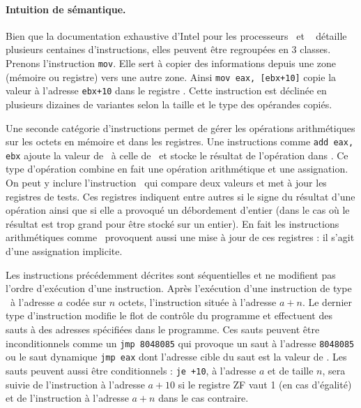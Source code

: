 \paragraph{Intuition de sémantique.}
% 

Bien que la documentation exhaustive d'Intel pour les processeurs \xq\ et \xs\ \cite{intel_vol2} détaille plusieurs centaines d'instructions, elles peuvent être regroupées en 3 classes.
Prenons l'instruction \texttt{mov}. Elle sert à copier des informations depuis une zone (mémoire ou registre) vers une autre zone.
Ainsi \texttt{mov eax, [ebx+10]} copie la valeur à l'adresse \texttt{ebx+10} dans le registre \eax. 
Cette instruction est déclinée en plusieurs dizaines de variantes selon la taille et le type des opérandes copiés.

Une seconde catégorie d'instructions permet de gérer les opérations arithmétiques sur les octets en mémoire et dans les registres.
Une instructions comme \texttt{add eax, ebx} ajoute la valeur de \ebx\ à celle de \eax\ et stocke le résultat de l'opération dans \eax.
Ce type d'opération combine en fait une opération arithmétique et une assignation. 
On peut y inclure l'instruction \cmp\ qui compare deux valeurs et met à jour les registres de tests. 
Ces registres indiquent entre autres si le signe du résultat d'une opération ainsi que si elle a provoqué un débordement d'entier (dans le cas où le résultat est trop grand pour être stocké sur un entier).
En fait les instructions arithmétiques comme \add\ provoquent aussi une mise à jour de ces registres : il s'agit d'une assignation implicite.

Les instructions précédemment décrites sont séquentielles et ne modifient pas l'ordre d'exécution d'une instruction. 
Après l'exécution d'une instruction de type \mov\ à l'adresse $a$ codée sur $n$ octets, l'instruction située à l'adresse $a+n$.
Le dernier type d'instruction modifie le flot de contrôle du programme et effectuent des sauts à des adresses spécifiées dans le programme.
Ces sauts peuvent être inconditionnels comme un \texttt{jmp 8048085} qui provoque un saut à l'adresse \texttt{8048085} ou le saut dynamique \texttt{jmp eax} dont l'adresse cible du saut est la valeur de \eax.
Les sauts peuvent aussi être conditionnels : \texttt{je +10}, à l'adresse $a$ et de taille $n$, sera suivie de l'instruction à l'adresse $a+10$ si le registre ZF vaut 1 (en cas d'égalité) et de l'instruction à l'adresse $a+n$ dans le cas contraire.



